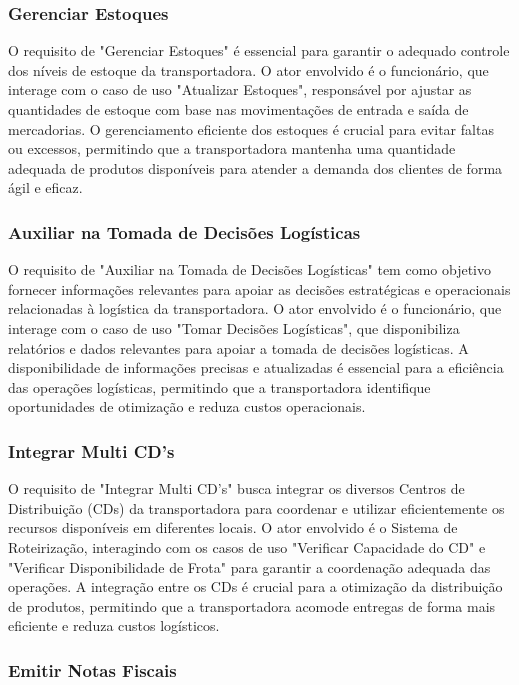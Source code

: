 \subsubsection{Gerenciar Estoques}

O requisito de "Gerenciar Estoques" é essencial para garantir o adequado controle dos níveis de estoque da transportadora. O ator envolvido é o funcionário, que interage com o caso de uso "Atualizar Estoques", responsável por ajustar as quantidades de estoque com base nas movimentações de entrada e saída de mercadorias. O gerenciamento eficiente dos estoques é crucial para evitar faltas ou excessos, permitindo que a transportadora mantenha uma quantidade adequada de produtos disponíveis para atender a demanda dos clientes de forma ágil e eficaz.

\subsubsection{Auxiliar na Tomada de Decisões Logísticas}

O requisito de "Auxiliar na Tomada de Decisões Logísticas" tem como objetivo fornecer informações relevantes para apoiar as decisões estratégicas e operacionais relacionadas à logística da transportadora. O ator envolvido é o funcionário, que interage com o caso de uso "Tomar Decisões Logísticas", que disponibiliza relatórios e dados relevantes para apoiar a tomada de decisões logísticas. A disponibilidade de informações precisas e atualizadas é essencial para a eficiência das operações logísticas, permitindo que a transportadora identifique oportunidades de otimização e reduza custos operacionais.

\subsubsection{Integrar Multi CD’s}

O requisito de "Integrar Multi CD’s" busca integrar os diversos Centros de Distribuição (CDs) da transportadora para coordenar e utilizar eficientemente os recursos disponíveis em diferentes locais. O ator envolvido é o Sistema de Roteirização, interagindo com os casos de uso "Verificar Capacidade do CD" e "Verificar Disponibilidade de Frota" para garantir a coordenação adequada das operações. A integração entre os CDs é crucial para a otimização da distribuição de produtos, permitindo que a transportadora acomode entregas de forma mais eficiente e reduza custos logísticos.

\subsubsection{Emitir Notas Fiscais}

